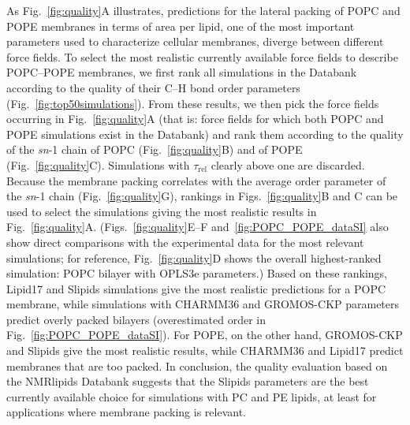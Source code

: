 \documentclass[fleqn,10pt]{wlscirep}
\begin{document}
As Fig.~\ref{fig:quality}A illustrates, predictions for the lateral packing of POPC and POPE membranes in terms of area per lipid, one of the most important parameters used to characterize cellular membranes, diverge between different force fields. To select the most realistic currently available force fields to describe POPC--POPE membranes, we first rank all simulations in the Databank according to the quality of their C--H bond order parameters  (Fig.~\ref{fig:top50simulations}). From these results, we then pick the force fields occurring in Fig.~\ref{fig:quality}A (that is: force fields for which both POPC and POPE simulations exist in the Databank) and rank them according to the quality of the \textit{sn}-1 chain of POPC (Fig.~\ref{fig:quality}B) and of POPE (Fig.~\ref{fig:quality}C). Simulations with $\tau_\mathrm{rel}$ clearly above one are discarded. Because the membrane packing correlates with the average order parameter of the \textit{sn}-1 chain (Fig.~\ref{fig:quality}G), rankings in Figs.~\ref{fig:quality}B and C can be used to select the simulations giving the most realistic results in Fig.~\ref{fig:quality}A. (Figs.~\ref{fig:quality}E--F and~\ref{fig:POPC_POPE_dataSI} also show direct comparisons with the experimental data for the most relevant simulations; for reference, Fig.~\ref{fig:quality}D shows the overall highest-ranked simulation: POPC bilayer with OPLS3e parameters.) Based on these rankings, Lipid17 and Slipids simulations give the most realistic predictions for a POPC membrane, while simulations with CHARMM36 and GROMOS-CKP parameters predict overly packed bilayers (overestimated order in Fig.~\ref{fig:POPC_POPE_dataSI}). For POPE, on the other hand, GROMOS-CKP and Slipids give the most realistic results, while CHARMM36 and Lipid17 predict membranes that are too packed. In conclusion, the quality evaluation based on the NMRlipids Databank suggests that the Slipids parameters are the best currently available choice for simulations with PC and PE lipids, at least for applications where membrane packing is relevant.
\end{document}
